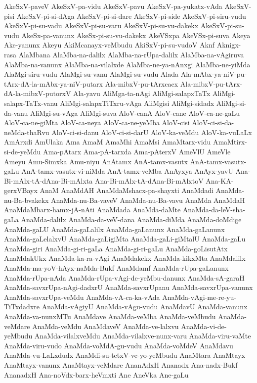 {AkeSxV-paveV
AkeSxV-pa-vidu
AkeSxV-pavu
AkeSxV-pa-yukatx-vAda
AkeSxV-pisi
AkeSxV-pi-si-dAga
AkeSxV-pi-si-dare
AkeSxV-pi-side
AkeSxV-pi-siru-vudu
AkeSxV-pi-su-vadu
AkeSxV-pi-su-varu
AkeSxV-pi-su-vu-dakekx
AkeSxV-pi-su-vudu
AkeSx-pa-vanunx
AkeSx-pi-su-vu-dakekx
AkeVSxpa
AkeVSx-pi-suva
Akeya
Ake-yanunx
Akeyu
AkiMcanayx-veMbudu
AkiSxV-pi-su-vudoV
Aknf
Aknigx-rasa
AlaMbana
AlaMba-na-dalilx
AlaMba-na-rUpa-dalilx
AlaMba-na-vAgiruva
AlaMba-na-vanunx
AlaMba-na-vilalxde
AlaMba-ne-ya-nAnxgi
AlaMba-ne-yiMda
AlaMgi-siru-vudu
AlaMgi-su-vanu
AlaMgi-su-vudu
Alada
Ala-mAbx-ya-niV-pu-tArx-dA-la-mAbx-ya-niV-putarx
Ala-mibxV-pu-tArxcacx
Ala-mibxV-pu-tArx-dA-la-mibxV-putorxV
Ala-yavu
AliMga-ta-nAgi
AliMgi-salapxTaTx
AliMgi-salapx-TaTx-vanu
AliMgi-salapxTiTxru-vAga
AliMgisi
AliMgi-sidadx
AliMgi-si-da-vanu
AliMgi-su-vAga
AliMgi-suva
AloV-canA
AloV-cane
AloV-ca-ne-gaLu
AloV-ca-ne-giMta
AloV-ca-neya
AloV-ca-ne-yeMba
AloV-cisi
AloV-ci-si-da-neMda-thaRvu
AloV-ci-si-danu
AloV-ci-si-darU
AloV-ka-veMdu
AloV-ka-vuLaLx
AmArxdi
AmUlaka
Ama
AmaM
AmaMhi
AmaMsi
AmaMtarx-vidu
AmaMtirx-si-de-yeMdu
Ama-pAtarx
Ama-pA-tarxda
Ama-pAterxV
AmeVlU
AmeVle
Ameyu
Amu-Simxka
Amu-niyu
AnAtamx
AnA-tamx-vasutx
AnA-tamx-vasutx-gaLu
AnA-tamx-vasutx-vi-niMda
AnA-tamx-veMba
AnAyxya
AnAyx-yavU
Ana-Bi-mAlx-tA-dAna-Bi-mAlxta
Ana-Bi-mAlx-tA-dAna-Bi-mAlxtoV
Ana-KA-gerxVBayx
AnaM
AnaMdAH
AnaMdaMshacx-pa-shayxti
AnaMdadi
AnaMda-nu-Ba-bvakekx
AnaMda-nu-Ba-vaveV
AnaMda-nu-Ba-vavu
AnaMda
AnaMdaH
AnaMdaMbarx-hamx-jA-nAti
AnaMdada
AnaMda-daMte
AnaMda-da-leV-sha-gaLa
AnaMda-dalilx
AnaMda-da-veV-dana
AnaMda-diMda
AnaMda-doMdige
AnaMda-gaLU
AnaMda-gaLalilx
AnaMda-gaLanunx
AnaMda-gaLanunx
AnaMda-gaLelalxvU
AnaMda-gaLigiMta
AnaMda-gaLi-giMtalU
AnaMda-gaLu
AnaMda-giri
AnaMda-gi-ri-gaLa
AnaMda-gi-ri-gaLu
AnaMda-goLisutAtx
AnaMdakUkx
AnaMda-ka-ra-vAgi
AnaMdakekx
AnaMda-kikxMta
AnaMdalilx
AnaMda-ma-yoV-hAyx-naMda-Bukf
AnaMdamf
AnaMda-rUpa-gaLanunx
AnaMda-rUpa-nAda
AnaMda-rUpa-vAgi-de-yeMbu-danunx
AnaMda-sA-garaH
AnaMda-savxrUpa-nAgi-dadxrU
AnaMda-savxrUpanu
AnaMda-savxrUpa-vanunx
AnaMda-savxrUpa-veMdu
AnaMda-vA-ca-ka-vAda
AnaMda-vAgi-me-re-yu-TiTxdadxre
AnaMda-vAgiyU
AnaMda-vAgu-vudu
AnaMdavU
AnaMda-vanunx
AnaMda-va-nunxMTu
AnaMdave
AnaMda-veMba
AnaMda-veMbudu
AnaMda-veMdare
AnaMda-veMdu
AnaMdaveV
AnaMda-ve-lalxvu
AnaMda-vi-de-yeMbudu
AnaMda-vilalxveMdu
AnaMda-vilalxve-nunx-varu
AnaMda-viru-vaMte
AnaMda-viru-vudo
AnaMda-voMdA-gu-vudu
AnaMda-voMdeV
AnaMdavu
AnaMda-vu-LaLxdudx
AnaMdi-su-tetxV-ve-yo-yeMbudu
AnaMtara
AnaMtayx
AnaMtayx-vanunx
AnaMtayx-veMdare
AnanAdxH
Ananadx
Ana-nadx-Bukf
AnanadxH
Ana-noVdx-barx-heVmxti
Ane
AneVka
Ane-gaLu
}

